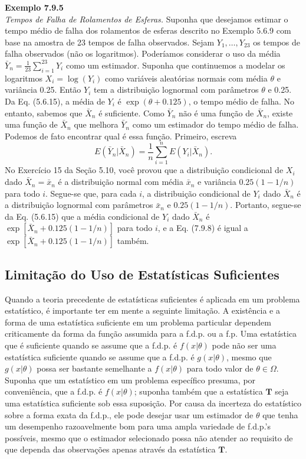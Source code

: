 \noindent\textbf{Exemplo 7.9.5} \\
\textit{Tempos de Falha de Rolamentos de Esferas.} Suponha que desejamos estimar o tempo médio de falha dos rolamentos de esferas descrito no Exemplo 5.6.9 com base na amostra de 23 tempos de falha observados. Sejam $Y_1, \dots, Y_{23}$ os tempos de falha observados (não os logaritmos). Poderíamos considerar o uso da média $\bar{Y}_n = \frac{1}{23}\sum_{i=1}^{23} Y_i$ como um estimador. Suponha que continuemos a modelar os logaritmos $X_i = \log(Y_i)$ como variáveis aleatórias normais com média $\theta$ e variância 0.25. Então $Y_i$ tem a distribuição lognormal com parâmetros $\theta$ e 0.25. Da Eq. (5.6.15), a média de $Y_i$ é $\exp(\theta + 0.125)$, o tempo médio de falha. No entanto, sabemos que $\bar{X}_n$ é suficiente. Como $\bar{Y}_n$ não é uma função de $\bar{X}_n$, existe uma função de $\bar{X}_n$ que melhora $\bar{Y}_n$ como um estimador do tempo médio de falha. Podemos de fato encontrar qual é essa função. Primeiro, escreva
\begin{equation}
E(\bar{Y}_n|\bar{X}_n) = \frac{1}{n}\sum_{i=1}^{n} E(Y_i|\bar{X}_n). \tag{7.9.8}
\end{equation}
No Exercício 15 da Seção 5.10, você provou que a distribuição condicional de $X_i$ dado $\bar{X}_n = \bar{x}_n$ é a distribuição normal com média $\bar{x}_n$ e variância $0.25(1-1/n)$ para todo $i$. Segue-se que, para cada $i$, a distribuição condicional de $Y_i$ dado $\bar{X}_n$ é a distribuição lognormal com parâmetros $\bar{x}_n$ e $0.25(1-1/n)$. Portanto, segue-se da Eq. (5.6.15) que a média condicional de $Y_i$ dado $\bar{X}_n$ é $\exp[\bar{X}_n + 0.125(1-1/n)]$ para todo $i$, e a Eq. (7.9.8) é igual a $\exp[\bar{X}_n + 0.125(1-1/n)]$ também.


\subsection*{Limitação do Uso de Estatísticas Suficientes}

Quando a teoria precedente de estatísticas suficientes é aplicada em um problema estatístico, é importante ter em mente a seguinte limitação. A existência e a forma de uma estatística suficiente em um problema particular dependem criticamente da forma da função assumida para a f.d.p. ou a f.p. Uma estatística que é suficiente quando se assume que a f.d.p. é $f(x|\theta)$ pode não ser uma estatística suficiente quando se assume que a f.d.p. é $g(x|\theta)$, mesmo que $g(x|\theta)$ possa ser bastante semelhante a $f(x|\theta)$ para todo valor de $\theta \in \Omega$. Suponha que um estatístico em um problema específico presuma, por conveniência, que a f.d.p. é $f(x|\theta)$; suponha também que a estatística $\mathbf{T}$ seja uma estatística suficiente sob essa suposição. Por causa da incerteza do estatístico sobre a forma exata da f.d.p., ele pode desejar usar um estimador de $\theta$ que tenha um desempenho razoavelmente bom para uma ampla variedade de f.d.p.'s possíveis, mesmo que o estimador selecionado possa não atender ao requisito de que dependa das observações apenas através da estatística $\mathbf{T}$.

